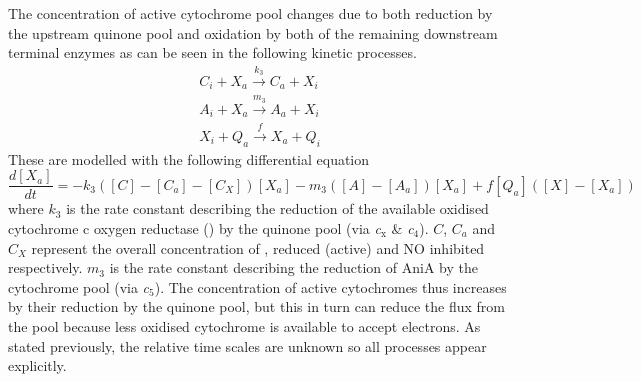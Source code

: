 The concentration of active cytochrome pool changes due to both reduction by the upstream quinone pool and oxidation by both of the remaining downstream terminal enzymes as can be seen in the following kinetic processes.
\begin{equation*}
\begin{gathered}
C_i + X_a \xrightarrow{k_3} C_a + X_i\\
A_i + X_a \xrightarrow{m_3} A_a + X_i\\
X_i + Q_a \xrightarrow{f} X_a + Q_i
\end{gathered}
\end{equation*}
These are modelled with the following differential equation
\begin{equation}
\frac{d[X_a]}{dt} = -k_3([C] - [C_a] - [C_X])[X_a]  - m_3([A] - [A_a])[X_a] + f[Q_a]([X]-[X_a])
\label{eq:cytochromes}
\end{equation}
where $k_3$ is the rate constant describing the reduction of the available oxidised cytochrome c oxygen reductase (\cbbthree{}) by the quinone pool (via \textit{c$_{\textrm{x}}$} \& \textit{c$_{\textrm{4}}$}). $C$, $C_a$ and $C_X$ represent the overall concentration of \cbbthree{}, reduced (active) \cbbthree{} and NO inhibited \cbbthree{} respectively. $m_3$ is the rate constant describing the reduction of AniA by the cytochrome pool (via \textit{c$_{\textrm{5}}$}). The concentration of active cytochromes thus increases by their reduction by the quinone pool, but this in turn can reduce the flux from the pool because less oxidised cytochrome is available to accept electrons. As stated previously, the relative time scales are unknown so all processes appear explicitly.


